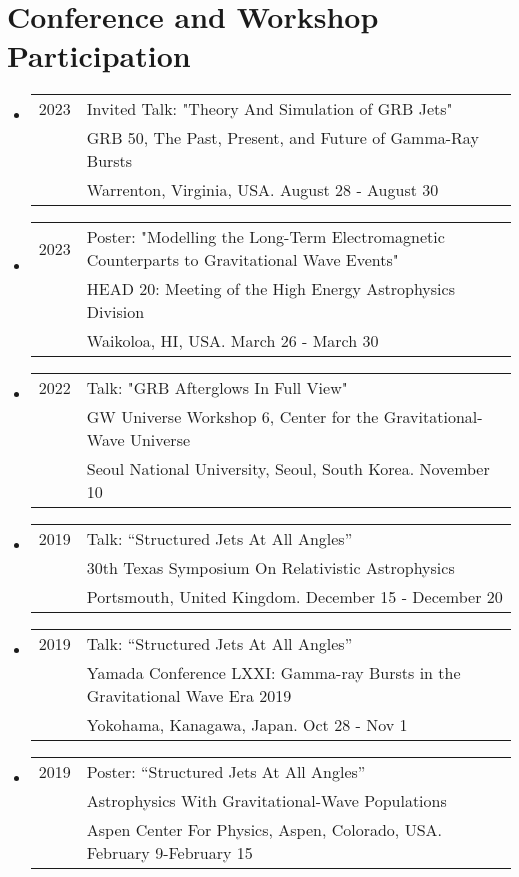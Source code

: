 \section*{Conference and Workshop Participation}
\begin{itemize}
\item \begin{tabular}{ll}
2023 & Invited Talk: "Theory And Simulation of GRB Jets"\\
	& GRB 50, The Past, Present, and Future of Gamma-Ray Bursts  \\
	& Warrenton, Virginia, USA. August 28 - August 30
\end{tabular}

\item \begin{tabular}{ll}
2023 & Poster: "Modelling the Long-Term Electromagnetic Counterparts to Gravitational Wave Events"\\
	& HEAD 20: Meeting of the High Energy Astrophysics Division  \\
	& Waikoloa, HI, USA. March 26 - March 30
\end{tabular}

\item \begin{tabular}{ll}
2022 & Talk: "GRB Afterglows In Full View"\\
	& GW Universe Workshop 6, Center for the Gravitational-Wave Universe  \\
	& Seoul National University, Seoul, South Korea.  November 10
\end{tabular}

\item \begin{tabular}{ll}
2019 & Talk: ``Structured Jets At All Angles'' \\
	 &  30th Texas Symposium On Relativistic Astrophysics \\
	 &  Portsmouth, United Kingdom. December 15 - December 20
\end{tabular}

\item \begin{tabular}{ll}
2019 & Talk: ``Structured Jets At All Angles'' \\
	 &  Yamada Conference LXXI: Gamma-ray Bursts in the Gravitational Wave Era 2019 \\
	 &  Yokohama, Kanagawa, Japan. Oct 28 - Nov 1
\end{tabular}

\item \begin{tabular}{ll}
2019 & Poster: ``Structured Jets At All Angles'' \\
	 &  Astrophysics With Gravitational-Wave Populations \\
	 &  Aspen Center For Physics, Aspen, Colorado, USA. February 9-February 15
\end{tabular}


\end{itemize}

